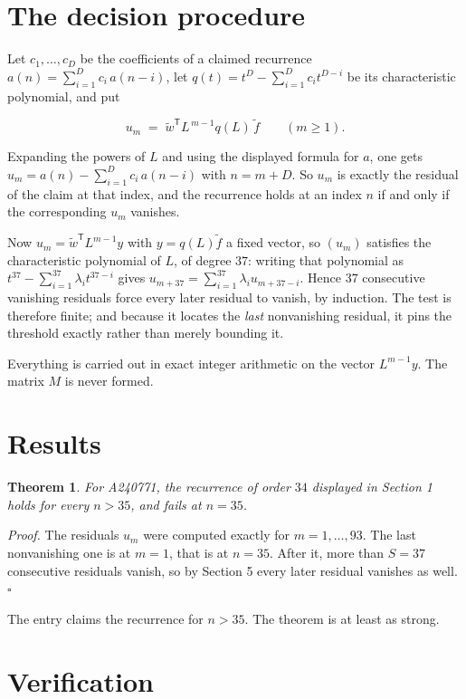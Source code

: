 \documentclass[11pt]{article}
\newtheorem{theorem}{Theorem}
\theoremstyle{definition}
\begin{document}
\section{The decision procedure}

Let $c_1,\dots,c_D$ be the coefficients of a claimed recurrence $a(n) = \sum_{i=1}^{D} c_i\,a(n-i)$, let $q(t) = t^{D} - \sum_{i=1}^{D} c_i t^{D-i}$ be its characteristic polynomial, and put

\[u_m \;=\; \tilde w^{\mathsf T} L^{\,m-1} q(L)\,\tilde f \qquad (m \ge 1).\]

Expanding the powers of $L$ and using the displayed formula for $a$, one gets $u_m = a(n) - \sum_{i=1}^{D} c_i\,a(n-i)$ with $n = m + D$. So $u_m$ is exactly the residual of the claim at that index, and the recurrence holds at an index $n$ if and only if the corresponding $u_m$ vanishes.

Now $u_m = \tilde w^{\mathsf T} L^{m-1} y$ with $y = q(L)\tilde f$ a fixed vector, so $(u_m)$ satisfies the characteristic polynomial of $L$, of degree $37$: writing that polynomial as $t^{37} - \sum_{i=1}^{37} \lambda_i t^{37-i}$ gives $u_{m+37} = \sum_{i=1}^{37} \lambda_i u_{m+37-i}$. Hence $37$ consecutive vanishing residuals force every later residual to vanish, by induction. The test is therefore finite; and because it locates the {\itshape last} nonvanishing residual, it pins the threshold exactly rather than merely bounding it.

Everything is carried out in exact integer arithmetic on the vector $L^{m-1}y$. The matrix $M$ is never formed.

\section{Results}

\begin{theorem} For A240771, the recurrence of order $34$ displayed in Section 1 holds for every $n > 35$, and fails at $n = 35$.\end{theorem}

{\itshape Proof.} The residuals $u_m$ were computed exactly for $m = 1,\dots,93$. The last nonvanishing one is at $m = 1$, that is at $n = 35$. After it, more than $S = 37$ consecutive residuals vanish, so by Section 5 every later residual vanishes as well. $\square$

The entry claims the recurrence for $n > 35$. The theorem is at least as strong.

\section{Verification}
\end{document}
